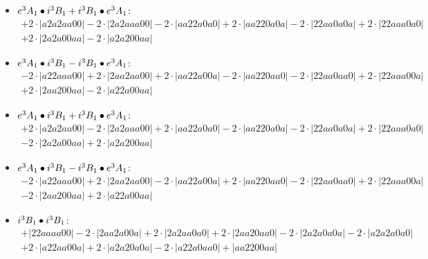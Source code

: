 \documentclass{article}
\begin{document}
\begin{itemize}
$$\begin{array}{c}
\end{array}$$
\item \boldmath$e^3 A_1 \bullet i^3 B_{1} + i^3 B_{1} \bullet e^3 A_1 \displaystyle $\unboldmath : \quad$$\begin{array}{c}
+2 \cdot \left|a2a2aa00\right| -2 \cdot \left|2a2aaa00\right| -2 \cdot \left|aa22a0a0\right| +2 \cdot \left|aa220a0a\right| -2 \cdot \left|22aa0a0a\right| +2 \cdot \left|22aaa0a0\right| \\[0.5cm] +2 \cdot \left|2a2a00aa\right| -2 \cdot \left|a2a200aa\right|
\end{array}$$
\item \boldmath$e^3 A_1 \bullet i^3 B_{1} - i^3 B_{1} \bullet e^3 A_1 \displaystyle $\unboldmath : \quad$$\begin{array}{c}
-2 \cdot \left|a22aaa00\right| +2 \cdot \left|2aa2aa00\right| +2 \cdot \left|aa22a00a\right| -2 \cdot \left|aa220aa0\right| -2 \cdot \left|22aa0aa0\right| +2 \cdot \left|22aaa00a\right| \\[0.5cm] +2 \cdot \left|2aa200aa\right| -2 \cdot \left|a22a00aa\right|
\end{array}$$
\item \boldmath$e^3 A_1 \bullet i^3 B_{1} + i^3 B_{1} \bullet e^3 A_1 \displaystyle $\unboldmath : \quad$$\begin{array}{c}
+2 \cdot \left|a2a2aa00\right| -2 \cdot \left|2a2aaa00\right| +2 \cdot \left|aa22a0a0\right| -2 \cdot \left|aa220a0a\right| -2 \cdot \left|22aa0a0a\right| +2 \cdot \left|22aaa0a0\right| \\[0.5cm] -2 \cdot \left|2a2a00aa\right| +2 \cdot \left|a2a200aa\right|
\end{array}$$
\item \boldmath$e^3 A_1 \bullet i^3 B_{1} - i^3 B_{1} \bullet e^3 A_1 \displaystyle $\unboldmath : \quad$$\begin{array}{c}
-2 \cdot \left|a22aaa00\right| +2 \cdot \left|2aa2aa00\right| -2 \cdot \left|aa22a00a\right| +2 \cdot \left|aa220aa0\right| -2 \cdot \left|22aa0aa0\right| +2 \cdot \left|22aaa00a\right| \\[0.5cm] -2 \cdot \left|2aa200aa\right| +2 \cdot \left|a22a00aa\right|
\end{array}$$
\item \boldmath$i^3 B_{1} \bullet i^3 B_{1} \displaystyle $\unboldmath : \quad$$\begin{array}{c}
+\left|22aaaa00\right| -2 \cdot \left|2aa2a00a\right| +2 \cdot \left|2a2aa0a0\right| +2 \cdot \left|2aa20aa0\right| -2 \cdot \left|2a2a0a0a\right| -2 \cdot \left|a2a2a0a0\right| \\[0.5cm] +2 \cdot \left|a22aa00a\right| +2 \cdot \left|a2a20a0a\right| -2 \cdot \left|a22a0aa0\right| +\left|aa2200aa\right|

\end{array}$$
\end{itemize}
\end{document}
